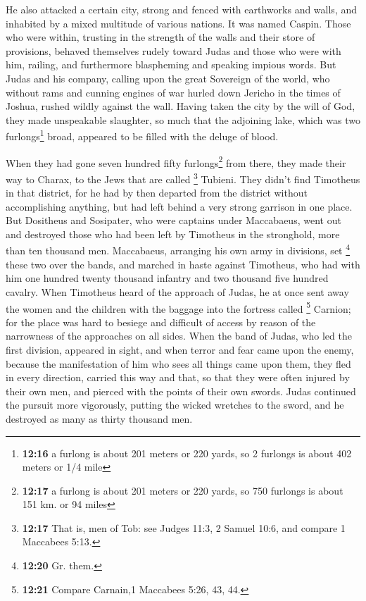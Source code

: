  He also attacked a certain city, strong and fenced with
earthworks and walls, and inhabited by a mixed multitude of various
nations. It was named Caspin.  Those who were within,
trusting in the strength of the walls and their store of provisions,
behaved themselves rudely toward Judas and those who were with him,
railing, and furthermore blaspheming and speaking impious words.
 But Judas and his company, calling upon the great
Sovereign of the world, who without rams and cunning engines of war
hurled down Jericho in the times of Joshua, rushed wildly against the
wall.  Having taken the city by the will of God, they
made unspeakable slaughter, so much that the adjoining lake, which was
two furlongs\footnote{\textbf{12:16} a furlong is about 201 meters or
  220 yards, so 2 furlongs is about 402 meters or 1/4 mile} broad,
appeared to be filled with the deluge of blood.

 When they had gone seven hundred fifty
furlongs\footnote{\textbf{12:17} a furlong is about 201 meters or 220
  yards, so 750 furlongs is about 151 km. or 94 miles} from there, they
made their way to Charax, to the Jews that are called \footnote{\textbf{12:17}
  That is, men of Tob: see Judges 11:3, 2 Samuel 10:6, and compare 1
  Maccabees 5:13.} Tubieni.  They didn't find Timotheus
in that district, for he had by then departed from the district without
accomplishing anything, but had left behind a very strong garrison in
one place.  But Dositheus and Sosipater, who were
captains under Maccabaeus, went out and destroyed those who had been
left by Timotheus in the stronghold, more than ten thousand men.
 Maccabaeus, arranging his own army in divisions, set
\footnote{\textbf{12:20} Gr. them.} these two over the bands, and
marched in haste against Timotheus, who had with him one hundred twenty
thousand infantry and two thousand five hundred cavalry. 
When Timotheus heard of the approach of Judas, he at once sent away the
women and the children with the baggage into the fortress called
\footnote{\textbf{12:21} Compare Carnain,1 Maccabees 5:26, 43, 44.}
Carnion; for the place was hard to besiege and difficult of access by
reason of the narrowness of the approaches on all sides. 
When the band of Judas, who led the first division, appeared in sight,
and when terror and fear came upon the enemy, because the manifestation
of him who sees all things came upon them, they fled in every direction,
carried this way and that, so that they were often injured by their own
men, and pierced with the points of their own swords. 
Judas continued the pursuit more vigorously, putting the wicked wretches
to the sword, and he destroyed as many as thirty thousand men.


